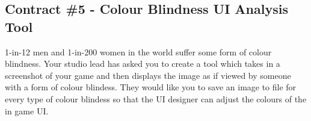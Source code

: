 \documentclass{../../fal_assignment}
\begin{document}
\subsection*{Contract \#5 - Colour Blindness UI Analysis Tool}
1-in-12 men and 1-in-200 women in the world suffer some form of colour blindness. Your studio lead has asked you to create a tool which takes in a screenshot of your game and then displays the image as if viewed by someone with a form of colour blindess. They would like you to save an image to file for every type of colour blindess so that the UI designer can adjust the colours of the in game UI.
\end{document}
